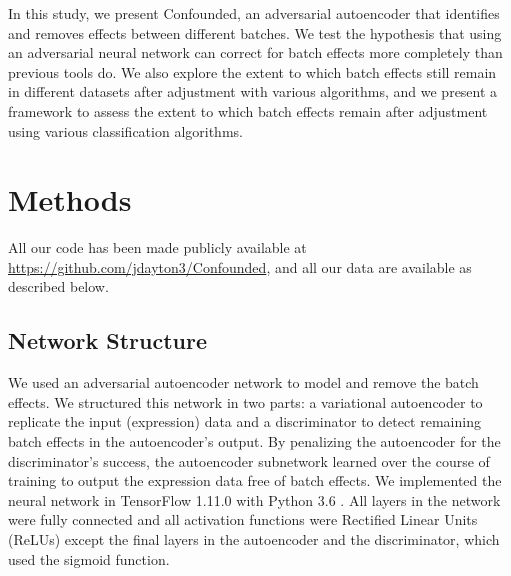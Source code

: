 \documentclass[notitlepage]{article}
\begin{document}
In this study, we present Confounded, an adversarial autoencoder that identifies and removes effects between different batches.
We test the hypothesis that using an adversarial neural network can correct for batch effects more completely than previous tools do.
We also explore the extent to which batch effects still remain in different datasets after adjustment with various algorithms, and we present a framework to assess the extent to which batch effects remain after adjustment using various classification algorithms.

\section{Methods} \label{sec:methods}

All our code has been made publicly available at \url{https://github.com/jdayton3/Confounded}, and all our data are available as described below.

\subsection{Network Structure}

We used an adversarial autoencoder network to model and remove the batch effects.
We structured this network in two parts: a variational autoencoder \cite{louizos_variational_2015} to replicate the input (expression) data and a discriminator to detect remaining batch effects in the autoencoder's output.
By penalizing the autoencoder for the discriminator's success, the autoencoder subnetwork learned over the course of training to output the expression data free of batch effects.
We implemented the neural network in TensorFlow 1.11.0 \cite{abadi_tensorflow_2015} with Python 3.6 \cite{python_software_foundation_python_2019}.
All layers in the network were fully connected and all activation functions were Rectified Linear Units (ReLUs) \cite{agarap_deep_2018} except the final layers in the autoencoder and the discriminator, which used the sigmoid function.
\end{document}
